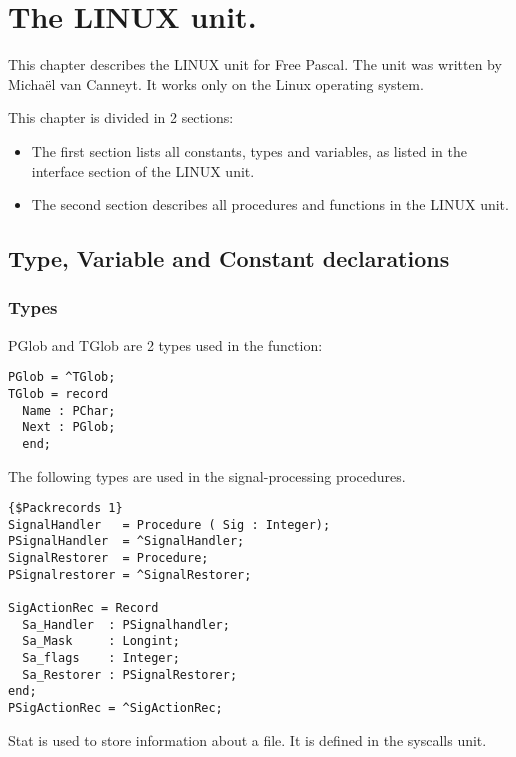 %
%
%
%
%
\chapter{The LINUX unit.}
This chapter describes the LINUX unit for Free Pascal. The unit was written
by Micha\"el van Canneyt. It works only on the Linux operating system.

This chapter is divided in 2 sections:
\begin{itemize}
\item The first section lists all constants, types and variables, as listed
in the interface section of the LINUX unit.
\item The second section describes all procedures and functions in the LINUX
unit.
\end{itemize}

\section{Type, Variable and Constant declarations}

\subsection{Types}
\label{sec:types}
PGlob and TGlob are 2 types used in the  function:
\begin{verbatim}
PGlob = ^TGlob;
TGlob = record
  Name : PChar;
  Next : PGlob;
  end;
\end{verbatim}
The following types are used in the signal-processing procedures.
\begin{verbatim}
{$Packrecords 1}
SignalHandler   = Procedure ( Sig : Integer);
PSignalHandler  = ^SignalHandler;
SignalRestorer  = Procedure;
PSignalrestorer = ^SignalRestorer;

SigActionRec = Record
  Sa_Handler  : PSignalhandler;
  Sa_Mask     : Longint;
  Sa_flags    : Integer;
  Sa_Restorer : PSignalRestorer;
end;
PSigActionRec = ^SigActionRec;
\end{verbatim}
Stat is used to store information about a file. It is defined in the
syscalls unit.

